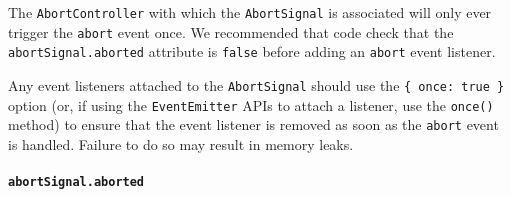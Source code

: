 \begin{Shaded}
\begin{Highlighting}[]
\OperatorTok{=}  \NormalTok{()}\OperatorTok{;}

 \OperatorTok{=}\NormalTok{ () }\KeywordTok{=\textgreater{}} \NormalTok{(}\NormalTok{)}\OperatorTok{;}

\NormalTok{(}\OperatorTok{,}\NormalTok{ (}\NormalTok{) }\KeywordTok{=\textgreater{}}\NormalTok{ \{}
  \NormalTok{(}\NormalTok{)}\OperatorTok{;}  
\NormalTok{\}}\OperatorTok{,}\NormalTok{ \{ }\OperatorTok{:} \NormalTok{ \})}\OperatorTok{;}

\NormalTok{()}\OperatorTok{;}
\end{Highlighting}
\end{Shaded}

The \texttt{AbortController} with which the \texttt{AbortSignal} is
associated will only ever trigger the
\texttt{\textquotesingle{}abort\textquotesingle{}} event once. We
recommended that code check that the \texttt{abortSignal.aborted}
attribute is \texttt{false} before adding an
\texttt{\textquotesingle{}abort\textquotesingle{}} event listener.

Any event listeners attached to the \texttt{AbortSignal} should use the
\texttt{\{\ once:\ true\ \}} option (or, if using the
\texttt{EventEmitter} APIs to attach a listener, use the \texttt{once()}
method) to ensure that the event listener is removed as soon as the
\texttt{\textquotesingle{}abort\textquotesingle{}} event is handled.
Failure to do so may result in memory leaks.

\paragraph{\texorpdfstring{\texttt{abortSignal.aborted}}{abortSignal.aborted}}\label{abortsignal.aborted}

